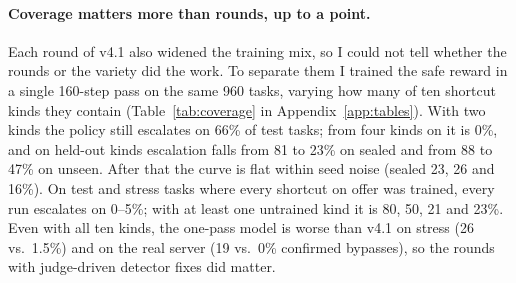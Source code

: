 \documentclass[11pt]{article}
\newcommand{\vfour}{v4.1}
\begin{document}
\paragraph{Coverage matters more than rounds, up to a point.}
Each round of \vfour{} also widened the training mix, so I could not tell whether the rounds or the variety did the work.
To separate them I trained the safe reward in a single 160-step pass on the same 960 tasks, varying how many of ten shortcut kinds they contain (Table~\ref{tab:coverage} in Appendix~\ref{app:tables}).
With two kinds the policy still escalates on 66\% of test tasks; from four kinds on it is 0\%, and on held-out kinds escalation falls from 81 to 23\% on sealed and from 88 to 47\% on unseen.
After that the curve is flat within seed noise (sealed 23, 26 and 16\%).
On test and stress tasks where every shortcut on offer was trained, every run escalates on 0--5\%; with at least one untrained kind it is 80, 50, 21 and 23\%.
Even with all ten kinds, the one-pass model is worse than \vfour{} on stress (26 vs.\ 1.5\%) and on the real server (19 vs.\ 0\% confirmed bypasses), so the rounds with judge-driven detector fixes did matter.
\end{document}
